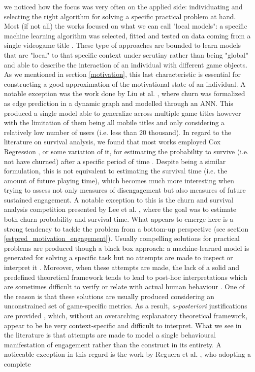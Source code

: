 we noticed how the focus was very often on the applied side: individuating and selecting the right algorithm for solving a specific practical problem at hand. Most (if not all) the works focused on what we can call "local models": a specific machine learning algorithm was selected, fitted and tested on data coming from a single videogame title \cite{runge2014churn, hadiji2014predicting, xie2015predicting, kim2017churn}. These type of approaches are bounded to learn models that are "local" to that specific context under scrutiny rather than being "global" and able to describe the interaction of an individual with different game objects. As we mentioned in section \ref{motivation}, this last characteristic is essential for constructing a good approximation of the motivational state of an individual. A notable exception was the work done by Liu et al. \cite{liu2018semi}, where churn was formalized as edge prediction in a dynamic graph and modelled through an ANN. This produced a single model able to generalize across multiple game titles however with the limitation of them being all mobile titles and only considering a relatively low number of users (i.e. less than 20 thousand). In regard to the literature on survival analysis, we found that most works employed Cox Regression \cite{cox1972regression}, or some variation of it, for estimating the probability to survive (i.e. not have churned) after a specific period of time \cite{perianez2016churn, bertens2017games, demediuk2018player}. Despite being a similar formulation, this is not equivalent to estimating the survival time (i.e. the amount of future playing time), which becomes much more interesting when trying to assess not only measures of disengagement but also measures of future sustained engagement. A notable exception to this is the churn and survival analysis competition presented by Lee et al. \cite{lee2018game}, where the goal was to estimate both churn probability and survival time. What appears to emerge here is a strong tendency to tackle the problem from a bottom-up perspective (see section \ref{estpred_motivation_engagement}). Usually compelling solutions for practical problems are produced though a black box approach: a machine-learned model is generated for solving a specific task but no attempts are made to inspect or interpret it \cite{lee2018game, liu2019micro, del2020time, kristensen2019combining}. Moreover, when these attempts are made, the lack of a solid and predefined theoretical framework tends to lead to post-hoc interpretations which are sometimes difficult to verify or relate with actual human behaviour \cite{drachen2016rapid, del2019profiling}. One of the reason is that these solutions are usually produced considering an unconstrained set of game-specific metrics. As a result, \textit{a-posteriori} justifications are provided \cite{drachen2012guns, makarovych2018like, drachen2009player}, which, without an overarching explanatory theoretical framework, appear to be be very context-specific and difficult to interpret. What we see in the literature is that attempts are made to model a single behavioural manifestation of engagement rather than the construct in its entirety. A noticeable exception in this regard is the work by Reguera et al. \cite{reguera2020quantifying}, who adopting a complete 